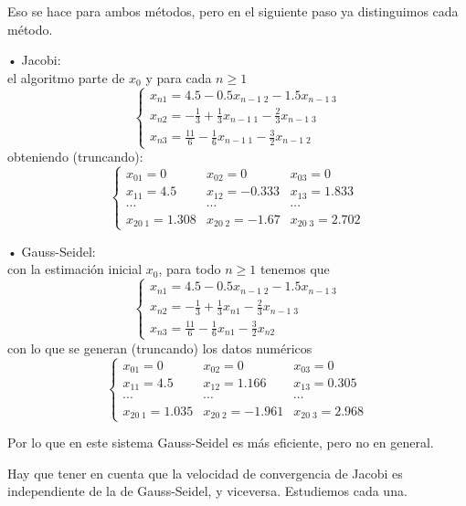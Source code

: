 \begin{ejemplo}
Eso se hace para ambos métodos, pero en el siguiente paso ya distinguimos cada método.
	\begin{nlist}
	\item[•] Jacobi:\\
	el algoritmo parte de $x_0$ y para cada $n \geq 1$
	\[ \left\{ \begin{array}{c}
	x_{n1} = 4.5 - 0.5x_{n-1 \; 2} - 1.5x_{n-1 \; 3} \\
	x_{n2} = - \frac{1}{3} + \frac{1}{3} x_{n-1 \; 1} - \frac{2}{3} x_{n-1 \; 3} \\
	x_{n3} = \frac{11}{6} - \frac{1}{6} x_{n-1 \; 1} - \frac{3}{2} x_{n-1 \; 2}
	\end{array}
	\right. \]
	obteniendo (truncando):
	\[
	\left\{ \begin{array}{lll}
	x_{01} = 0 & x_{02} = 0 & x_{03} = 0 \\
	x_{11} = 4.5 & x_{12} = -0.333 & x_{13} = 1.833 \\
	\cdots & \cdots & \cdots \\
	x_{20 \; 1} = 1.308 & x_{20 \; 2} = -1.67 & x_{20 \; 3} = 2.702
	\end{array}
	\right.
	\]
	\item[•] Gauss-Seidel:\\
	con la estimación inicial $x_0$, para todo $n \geq 1$ tenemos que
	\[ \left\{ \begin{array}{c}
	x_{n1} = 4.5 - 0.5x_{n-1 \; 2} - 1.5x_{n-1 \; 3} \\
	x_{n2} = - \frac{1}{3} + \frac{1}{3} x_{n1} - \frac{2}{3} x_{n-1 \; 3} \\
	x_{n3} = \frac{11}{6} - \frac{1}{6} x_{n1} - \frac{3}{2} x_{n2}
	\end{array}
	\right. \]
	con lo que se generan (truncando) los datos numéricos
	\[
	\left\{ \begin{array}{lll}
	x_{01} = 0 & x_{02} = 0 & x_{03} = 0 \\
	x_{11} = 4.5 & x_{12} = 1.166 & x_{13} = 0.305 \\
	\cdots & \cdots & \cdots \\
	x_{20 \; 1} = 1.035 & x_{20 \; 2} = -1.961 & x_{20 \; 3} = 2.968
	\end{array}
	\right.
	\]
	\end{nlist}
Por lo que en este sistema Gauss-Seidel es más eficiente, pero no en general.
\end{ejemplo}

Hay que tener en cuenta que la velocidad de convergencia de Jacobi es independiente de la de Gauss-Seidel, y viceversa. Estudiemos cada una.

